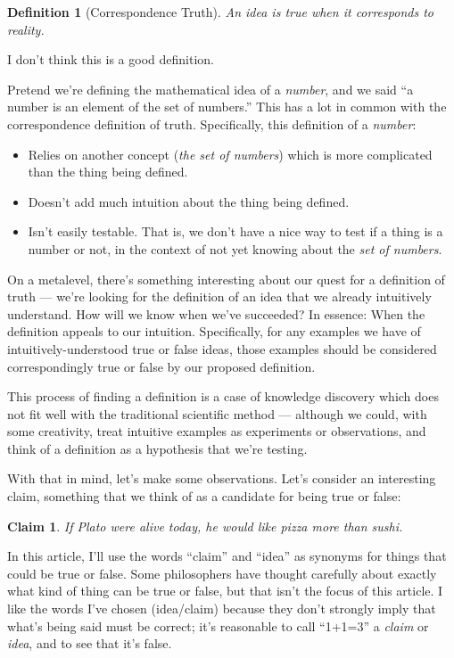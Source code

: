 \documentclass[11pt, oneside]{article}
\newtheorem*{defn}{Definition}
\newtheorem*{claim}{Claim}
\begin{document}
\begin{defn}[Correspondence Truth]\label{d1}
    An idea is true when it corresponds to reality.
\end{defn}

I don't think this is a good definition.

Pretend we're defining the mathematical idea of a {\em number}, and we said
``a number is an element of the set of numbers.'' This 
has a lot in common with the correspondence definition of truth.
Specifically, this definition of a {\em number}:
\begin{itemize}
    \item Relies on another concept ({\em the set of numbers})
        which is more complicated than the thing
        being defined. 
    \item Doesn't add much intuition about the thing being defined.
    \item Isn't easily testable. That is, we don't have a nice
        way to test if a thing is a number or not, in the context of not yet
        knowing about the {\em set of numbers}.
\end{itemize}

On a metalevel, there's something interesting about our quest for a definition
of truth --- we're
looking for the definition of an idea that we already intuitively understand.
How will we know when we've succeeded?
In essence: When the definition
appeals to our intuition.
Specifically, for any examples we have of intuitively-understood true or false
ideas, those examples should be considered correspondingly true or false by our
proposed definition.

This process of finding a definition is a case of
knowledge discovery which does not fit well with the traditional scientific
method --- although we could, with some creativity, treat
intuitive examples as
experiments or observations, and think of a definition as a hypothesis that
we're testing.

With that in mind, let's make some observations. Let's consider an
interesting claim, something that we think of as a candidate for
being true or false:
\begin{claim}\label{c1}
    If Plato were alive today, he would like pizza more than sushi.
\end{claim}
In this article, I'll use the words ``claim'' and ``idea'' as
synonyms for things that could be true or false. Some philosophers have thought
carefully about exactly what kind of thing can be true or false, but that isn't
the focus of this article.
I like the words I've chosen (idea/claim) because they don't
strongly imply that what's being said must be correct; it's reasonable to
call ``1+1=3'' a {\em claim} or {\em idea}, and to see that it's false.
\end{document}
